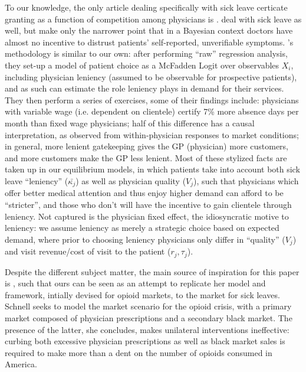 \documentclass[../main.tex]{subfiles}
\begin{document}
To our knowledge, the only article dealing specifically with sick leave certicate granting as a function of competition among physicians is \cite{markussen-roed}. \cite{cln} deal with sick leave as well, but make only the narrower point that in a Bayesian context doctors have almost no incentive to distrust patients' self-reported, unverifiable symptoms. \citeauthor{markussen-roed}'s methodology is similar to our own: after performing ``raw'' regression analysis, they set-up a model of patient choice as a McFadden Logit over observables $X_i$, including physician leniency (assumed to be observable for prospective patients), and as such can estimate the role leniency plays in demand for their services. They then perform a series of exercises, some of their findings include: physicians with variable wage (i.e. dependent on clientele) certify 7\% more absence days per month than fixed wage physicians; half of this difference has a causal interpretation, as observed from within-physician responses to market conditions; in general, more lenient gatekeeping gives the GP (physician) more customers, and more customers make the GP less lenient. Most of these stylized facts are taken up in our equilibrium models, in which patients take into account both sick leave ``leniency'' ($\bar{\kappa_j}$) as well as physician quality ($V_j$), such that physicians which offer better medical attention and thus enjoy higher demand can afford to be ``stricter'', and those who don't will have the incentive to gain clientele through leniency. Not captured is the physician fixed effect, the idiosyncratic motive to leniency: we assume leniency as merely a strategic choice based on expected demand, where prior to choosing leniency physicians only differ in ``quality'' ($V_j$) and visit revenue/cost of visit to the patient ($r_j, \tau_j$).

Despite the different subject matter, the main source of inspiration for this paper is \cite{schnell2017physician}, such that ours can be seen as an attempt to replicate her model and framework, intially devised for opioid markets, to the market for sick leaves. Schnell seeks to model the market scenario for the opioid crisis, with a primary market composed of physician prescriptions and a secondary black market. The presence of the latter, she concludes, makes unilateral interventions ineffective: curbing both excessive physician prescriptions as well as black market sales is required to make more than a dent on the number of opioids consumed in America.
\end{document}
